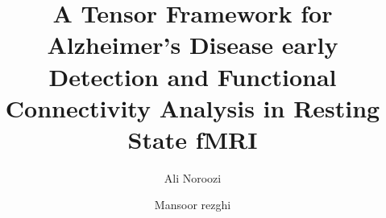 \documentclass[preprint,12pt]{elsarticle}
\begin{document}
	
	\begin{frontmatter}
		
		
		\author{Ali Noroozi}
		\author{Mansoor rezghi}
		\address{Department of Computer Science, Tarbiat Modares University, Tehran-Iran}
		
		\title{A Tensor Framework for Alzheimer's Disease early Detection and Functional Connectivity Analysis in Resting State fMRI}
		
		
		
		
		\address{}
		
		\begin{abstract}
			

\end{abstract}
\end{frontmatter}
\end{document}
